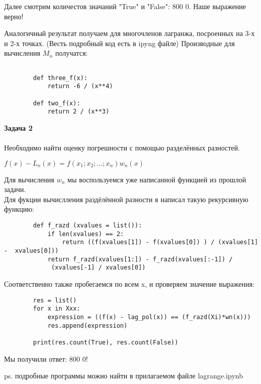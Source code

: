 \documentclass[letterpaper,12pt]{article}
\begin{document}
    Далее смотрим количестов значаний "True" и "False":
    800 0. Наше выражение верно!

    Аналогичный результат получаем для 
    многочленов лагранжа, посроенных на 3-х и 2-х
    точках. (Весть подробный код есть в ipyng файле)
    Производные для вычисления $M_n$ получатся:

    \begin{lstlisting}
        
        def three_f(x):
            return -6 / (x**4)

        def two_f(x):
            return 2 / (x**3)

    \end{lstlisting}

    \textbf{Задача 2}
    \\~\\
    Необходимо найти оценку погрешности с 
    помощью разделённых разностей.

    \begin{center}

        $f(x) - L_n(x) = f(x_1; x_2; ... 
        ;x_n) w_n(x)$

    \end{center}

    Для вычисления $w_n$ мы воспользуемся 
    уже написанной функцией из прошлой задачи.
    \\
    Для фукции вычислления раздёлённой разности 
    я написал такую рекурсивную функцию:

    \begin{lstlisting}
        def f_razd (xvalues = list()):
            if len(xvalues) == 2:
                return ((f(xvalues[1]) - f(xvalues[0]) ) / (xvalues[1] -  xvalues[0])) 
            return f_razd(xvalues[1:]) - f_razd(xvalues[:-1]) /
             (xvalues[-1] / xvalues[0])
    \end{lstlisting}

    Соответственно также пробегаемся по всем x,
    и проверяем значение выражения:

    \begin{lstlisting}
        res = list()
        for x in Xxx:
            expression = ((f(x) - lag_pol(x)) == (f_razd(Xi)*wn(x)))
            res.append(expression)

        print(res.count(True), res.count(False))
    \end{lstlisting}

    Мы получили ответ: 800 0!

    \begin{flushright}
        ps. подробные программы можно 
        найти в прилагаемом файле lagrange.ipynb
    \end{flushright}
\end{document}
